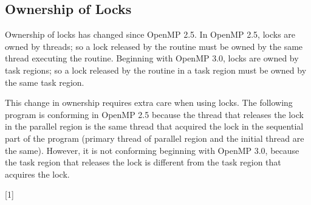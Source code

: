 \subsection{Ownership of Locks}
\label{subsec:lock_owner}

Ownership of locks has changed since OpenMP 2.5. In OpenMP 2.5, locks are owned 
by threads; so a lock released by the  routine must be 
owned by the same thread executing the routine.  Beginning with OpenMP 3.0, locks are owned 
by task regions; so a lock released by the  routine in 
a task region must be owned by the same task region.

This change in ownership requires extra care when using locks. The following program 
is conforming in OpenMP 2.5 because the thread that releases the lock  
in the parallel region is the same thread that acquired the lock in the sequential 
part of the program (primary thread of parallel region and the initial thread are 
the same). However, it is not conforming beginning with OpenMP 3.0, because the task 
region that releases the lock  is different from the task region that 
acquires the lock.


[1]



